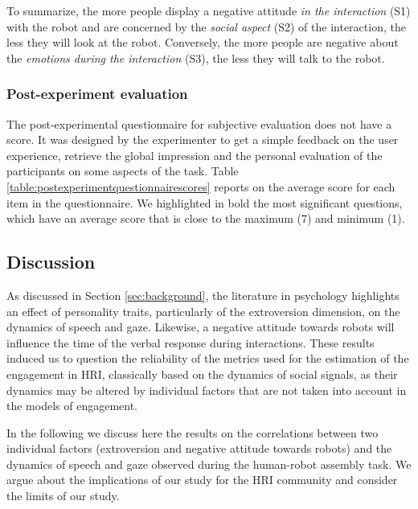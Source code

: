 To summarize, the more people display a negative attitude \textit{in the interaction} (S1) with the robot and are concerned by the \textit{social aspect} (S2) of the interaction, the less they will look at the robot. Conversely, the more people are negative about the \textit{emotions during the interaction} (S3), the less they will talk to the robot.



\subsubsection{Post-experiment evaluation}

The post-experimental questionnaire for subjective evaluation does not have a score. 
It was designed by the experimenter to get a simple feedback on the user experience, retrieve the global impression and the personal evaluation of the participants on some aspects of the task.
Table \ref{table:postexperimentquestionnairescores} reports on the average score for each item in the questionnaire. We highlighted in bold the most significant questions, which have an average score that is close to the maximum (7) and minimum (1).





\subsection{Discussion}



As discussed in Section \ref{sec:background}, the literature in psychology highlights an effect of personality traits, particularly of the extroversion dimension, on the dynamics of speech and gaze. Likewise, a negative attitude towards robots will influence the time of the verbal response during interactions.
These results induced us to question the reliability of the metrics used for the estimation of the engagement in HRI, classically based on the dynamics of social signals, as their dynamics may be altered by individual factors that are not taken into account in the models of engagement.

In the following we discuss here the results on the correlations between two individual factors (extroversion and negative attitude towards robots) and the dynamics of speech and gaze observed during the human-robot assembly task. We argue about the implications of our study for the HRI community and consider the limits of our study. 


